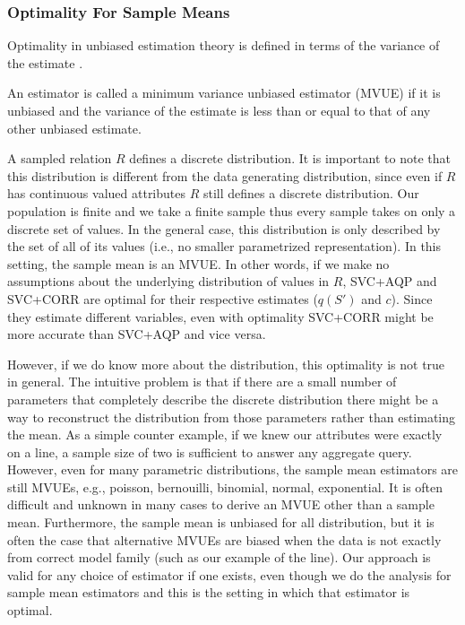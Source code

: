 \subsubsection{Optimality For Sample Means}
Optimality in unbiased estimation theory is defined in terms of the variance of the estimate \cite{cox1979theoretical}.
\begin{proposition}
An estimator is called a minimum variance unbiased estimator (MVUE) if it is unbiased and the variance of the estimate is less than or equal to that of any other unbiased estimate.
\end{proposition}

A sampled relation $R$ defines a discrete distribution. It is important to note that this distribution is different from the data generating distribution, since even if $R$ has continuous valued attributes $R$ still defines a discrete distribution. Our population is finite and we take a finite sample thus every sample takes on only a discrete set of values. In the general case, this distribution is only described by the set of all of its values (i.e., no smaller parametrized representation). In this setting, the sample mean is an MVUE. In other words, if we make no assumptions about the underlying distribution of values in $R$, SVC+AQP and SVC+CORR are optimal for their respective estimates ($q(S')$ and $c$). Since they estimate different variables, even with optimality SVC+CORR might be more accurate than SVC+AQP and vice versa. 

However, if we do know more about the distribution, this optimality is not true in general. The intuitive problem is that if there are a small number of parameters that completely describe the discrete distribution there might be a way to reconstruct the distribution from those parameters rather than estimating the mean. As a simple counter example, if we knew our attributes were exactly on a line, a sample size of two is sufficient to answer any aggregate query. However, even for many parametric distributions, the sample mean estimators are still MVUEs, e.g., poisson, bernouilli, binomial, normal, exponential. It is often difficult and unknown in many cases to derive an MVUE other than a sample mean. Furthermore, the sample mean is unbiased for all distribution, but it is often the case that alternative MVUEs are biased when the data is not exactly from correct model family (such as our example of the line). Our approach is valid for any choice of estimator if one exists, even though we do the analysis for sample mean estimators and this is the setting in which that estimator is optimal.

